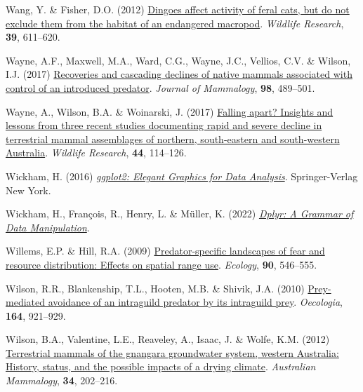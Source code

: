 \documentclass[11pt,a4paper,titlepage,twoside,openright]{style/unimelbthesis}
\newenvironment{CSLReferences}%
  {}%
  {\par}
\begin{document}
\begin{mainmatter}
\begin{CSLReferences}{1}{0}
\leavevmode{}%
Wang, Y. \& Fisher, D.O. (2012) \href{https://doi.org/10.1071/WR11210}{Dingoes affect activity of feral cats, but do not exclude them from the habitat of an endangered macropod}. \emph{Wildlife Research}, \textbf{39}, 611--620.

\leavevmode{}%
Wayne, A.F., Maxwell, M.A., Ward, C.G., Wayne, J.C., Vellios, C.V. \& Wilson, I.J. (2017) \href{https://doi.org/10.1093/jmammal/gyw237}{{Recoveries and cascading declines of native mammals associated with control of an introduced predator}}. \emph{Journal of Mammalogy}, \textbf{98}, 489--501.

\leavevmode{}%
Wayne, A., Wilson, B.A. \& Woinarski, J. (2017) \href{https://doi.org/10.1071/WR16178}{Falling apart? Insights and lessons from three recent studies documenting rapid and severe decline in terrestrial mammal assemblages of northern, south-eastern and south-western {A}ustralia}. \emph{Wildlife Research}, \textbf{44}, 114--126.

\leavevmode{}%
Wickham, H. (2016) \emph{\href{https://ggplot2.tidyverse.org}{{g}gplot2: Elegant Graphics for Data Analysis}}. Springer-Verlag New York.

\leavevmode{}%
Wickham, H., François, R., Henry, L. \& Müller, K. (2022) \emph{\href{https://CRAN.R-project.org/package=dplyr}{Dplyr: A Grammar of Data Manipulation}}.

\leavevmode{}%
Willems, E.P. \& Hill, R.A. (2009) \href{https://doi.org/10.1890/08-0765.1}{Predator-specific landscapes of fear and resource distribution: Effects on spatial range use}. \emph{Ecology}, \textbf{90}, 546--555.

\leavevmode{}%
Wilson, R.R., Blankenship, T.L., Hooten, M.B. \& Shivik, J.A. (2010) \href{https://doi.org/10.1007/s00442-010-1797-8}{Prey-mediated avoidance of an intraguild predator by its intraguild prey}. \emph{Oecologia}, \textbf{164}, 921--929.

\leavevmode{}%
Wilson, B.A., Valentine, L.E., Reaveley, A., Isaac, J. \& Wolfe, K.M. (2012) \href{https://doi.org/10.1071/AM11040}{Terrestrial mammals of the gnangara groundwater system, western {A}ustralia: History, status, and the possible impacts of a drying climate}. \emph{{A}ustralian Mammalogy}, \textbf{34}, 202--216.


\end{CSLReferences}
\end{mainmatter}
\end{document}
